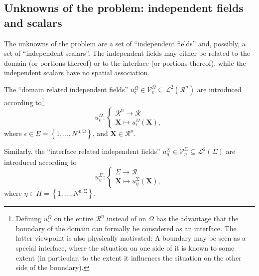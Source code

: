 \documentclass[pdftex,a4paper,12pt,abstracton]{scrartcl}
\begin{document}
\subsection{Unknowns of the problem: independent fields and scalars}
The unknowns of the problem are a set of ``independent fields'' and, possibly, a set of ``independent scalars''. The independent fields may either be related to the domain (or portions thereof) or to the interface (or portions thereof), while the independent scalars have no spatial association.

The ``domain related independent fields'' $u^\Omega_\epsilon \in \mathcal{V}^\Omega_\epsilon \subseteq \mathcal{L}^2(\mathcal{R}^n)$ are introduced according to\footnote{Defining $u^\Omega_\epsilon$ on the entire $\mathcal{R}^n$ instead of on  $\Omega$ has the advantage that the boundary of the domain can formally be considered as an interface. The latter viewpoint is also physically motivated: A boundary may be seen as a special interface, where the situation on one side of it is known to some extent (in particular, to the extent it influences the situation on the other side of the boundary).}
\begin{equation}
u^\Omega_\epsilon:
\begin{cases}
\mathcal{R}^n \rightarrow \mathcal{R}\\
\boldsymbol{X} \mapsto u^\Omega_\epsilon(\boldsymbol{X}),
\end{cases}
\end{equation}
where $\epsilon \in E=\left\{1, \hdots, N^\mathrm{u,\Omega}\right\}$, and $\boldsymbol{X}\in \mathcal{R}^n$.

Similarly, the ``interface related independent fields'' $u^\Sigma_\eta \in \mathcal{V}^\Sigma_\eta \subseteq \mathcal{L}^2(\Sigma)$ are introduced according to
\begin{equation}
u^\Sigma_\eta:
\begin{cases}
\Sigma \rightarrow \mathcal{R}\\
\boldsymbol{X} \mapsto u^\mathrm{\Sigma}_\eta(\boldsymbol{X}),
\end{cases}
\end{equation}
where $\eta \in H=\left\{1, \hdots, N^\mathrm{u,\Sigma}\right\}$.
\end{document}
